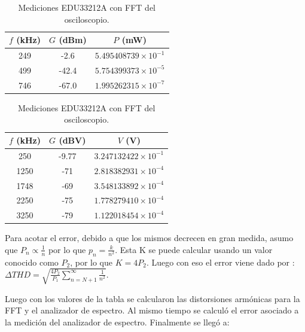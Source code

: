 \begin{table}[h!]
\centering

\begin{minipage}{0.47\textwidth}
\centering
\begin{tabular}{ccc}
\toprule
$f$ (kHz) & $G$ (dBm) & $P$ (mW) \\
\midrule
249 & -2.6  & $5.495408739\times10^{-1}$ \\
499 & -42.4 & $5.754399373\times10^{-5}$ \\
746 & -67.0 & $1.995262315\times10^{-7}$ \\
\bottomrule
\end{tabular}
\caption{Mediciones EDU33212A con analizador de espectros.}
\end{minipage}
\hfill
\begin{minipage}{0.47\textwidth}
\centering
\begin{tabular}{ccc}
\toprule
$f$ (kHz) & $G$ (dBV) & $V$ (V) \\
\midrule
250  & -9.77 & $3.247132422\times10^{-1}$ \\
1250 & -71   & $2.818382931\times10^{-4}$ \\
1748 & -69   & $3.548133892\times10^{-4}$ \\
2250 & -75   & $1.778279410\times10^{-4}$ \\
3250 & -79   & $1.122018454\times10^{-4}$ \\
\bottomrule
\end{tabular}
\caption{Mediciones EDU33212A con FFT del osciloscopio.}
\end{minipage}

\end{table}



Para acotar el error, debido a que los mismos decrecen en gran medida, asumo que $P_n \propto \frac{1}{n}$ por lo que $p_n = \frac{k}{n^2}$. Esta K se puede calcular usando un valor conocido como $P_2$, por lo que $K=4P_2$. Luego con eso el error viene dado por :$\Delta THD=
\sqrt{
\frac{4P_2}{P_1}
\sum_{n=N+1}^{\infty}\frac{1}{n^2}
}$.\par

Luego con los valores de la tabla se calcularon las distorsiones armónicas para la FFT y el analizador de espectro. Al mismo tiempo se calculó el error asociado a la medición del analizador de espectro. Finalmente se llegó a:


